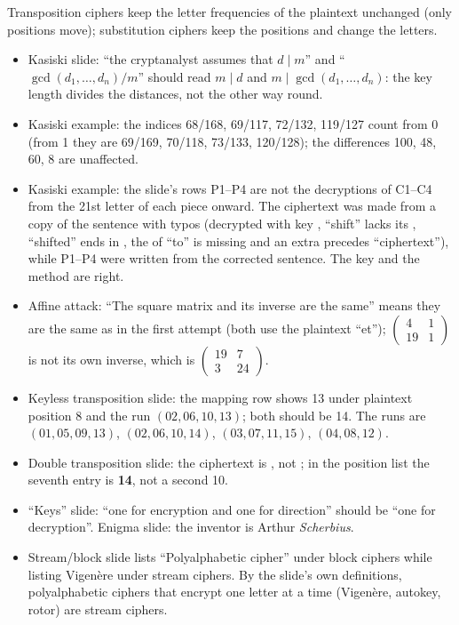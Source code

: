 Transposition ciphers keep the letter frequencies of the plaintext unchanged (only positions move); substitution ciphers keep the positions and change the letters.

\begin{fixbox}
\begin{itemize}[leftmargin=1.2em,itemsep=0pt]
  \item Kasiski slide: ``the cryptanalyst assumes that $d \mid m$'' and ``$\gcd(d_1, \dots, d_n)/m$'' should read $m \mid d$ and $m \mid \gcd(d_1, \dots, d_n)$: the key length divides the distances, not the other way round.
  \item Kasiski example: the indices 68/168, 69/117, 72/132, 119/127 count from 0 (from 1 they are 69/169, 70/118, 73/133, 120/128); the differences 100, 48, 60, 8 are unaffected.
  \item Kasiski example: the slide's rows P1--P4 are not the decryptions of C1--C4 from the 21st letter of each piece onward. The ciphertext was made from a copy of the sentence with typos (decrypted with key , ``shift'' lacks its , ``shifted'' ends in , the  of ``to'' is missing and an extra  precedes ``ciphertext''), while P1--P4 were written from the corrected sentence. The key  and the method are right.
  \item Affine attack: ``The square matrix and its inverse are the same'' means they are the same as in the first attempt (both use the plaintext ``et''); $\left(\begin{smallmatrix}4&1\\19&1\end{smallmatrix}\right)$ is not its own inverse, which is $\left(\begin{smallmatrix}19&7\\3&24\end{smallmatrix}\right)$.
  \item Keyless transposition slide: the mapping row shows 13 under plaintext position 8 and the run $(02, 06, 10, 13)$; both should be 14. The runs are $(01,05,09,13)$, $(02,06,10,14)$, $(03,07,11,15)$, $(04,08,12)$.
  \item Double transposition slide: the ciphertext is \textbf{}, not ; in the position list the seventh entry is \textbf{14}, not a second 10.
  \item ``Keys'' slide: ``one for encryption and one for direction'' should be ``one for decryption''. Enigma slide: the inventor is Arthur \emph{Scherbius}.
  \item Stream/block slide lists ``Polyalphabetic cipher'' under block ciphers while listing Vigen\`ere under stream ciphers. By the slide's own definitions, polyalphabetic ciphers that encrypt one letter at a time (Vigen\`ere, autokey, rotor) are stream ciphers.
\end{itemize}
\end{fixbox}
